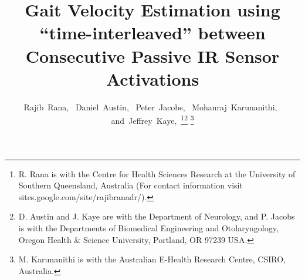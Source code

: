 \documentclass[journal]{IEEEtran}
\begin{document}
\title{Gait Velocity Estimation using ``time-interleaved'' between Consecutive Passive IR Sensor Activations}


\author{Rajib~Rana,~
        Daniel~Austin,~
	Peter~Jacobs,~
	Mohanraj~Karunanithi,~
        and~Jeffrey~Kaye,~\thanks{R. Rana is with the Centre for Health Sciences Research at the University of Southern Queensland, Australia (For contact information visit sites.google.com/site/rajibranadr/).}\thanks{D. Austin and J. Kaye are with the Department of Neurology, and P. Jacobs is with the Departments of Biomedical Engineering and Otolaryngology, Oregon Health \& Science University, Portland, OR 97239 USA.}
\thanks{M. Karunanithi is with the Australian E-Health Research Centre, CSIRO, Australia.}
}



















\maketitle
\end{document}
